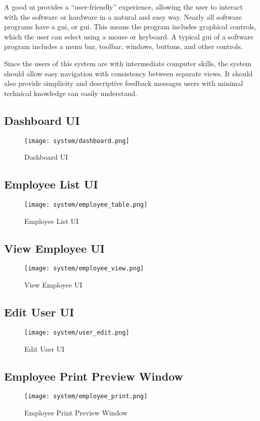 \documentclass[12pt]{report}
\begin{document}
A good \acrshort{ui} provides a ``user-friendly'' experience, allowing the user to interact with the software or hardware in a natural and easy way. Nearly all software programs have a \acrlong{gui}, or \acrshort{gui}. This means the program includes graphical controls, which the user can select using a mouse or
keyboard. A typical \acrshort{gui} of a software program includes a menu bar, toolbar, windows, buttons, and other controls.

Since the users of this system are with intermediate computer skills, the system should allow easy navigation with consistency between separate views. It should also provide simplicity and descriptive feedback messages users with minimal technical knowledge can easily understand.

\subsection{Dashboard UI}
\begin{figure}[H]
	\centering
	\texttt{[image: system/dashboard.png]}
	\caption{Dashboard UI}
\end{figure}

\subsection{Employee List UI}
\begin{figure}[H]
	\centering
	\texttt{[image: system/employee\_table.png]}
	\caption{Employee List UI}
\end{figure}

\subsection{View Employee UI}
\begin{figure}[H]
	\centering
	\texttt{[image: system/employee\_view.png]}
	\caption{View Employee UI}
\end{figure}

\subsection{Edit User UI}
\begin{figure}[H]
	\centering
	\texttt{[image: system/user\_edit.png]}
	\caption{Edit User UI}
\end{figure}

\subsection{Employee Print Preview Window}
\begin{figure}[H]
	\centering
	\texttt{[image: system/employee\_print.png]}
	\caption{Employee Print Preview Window}
\end{figure}


\singlespacing
\printbibliography[title={References}]
\end{document}
